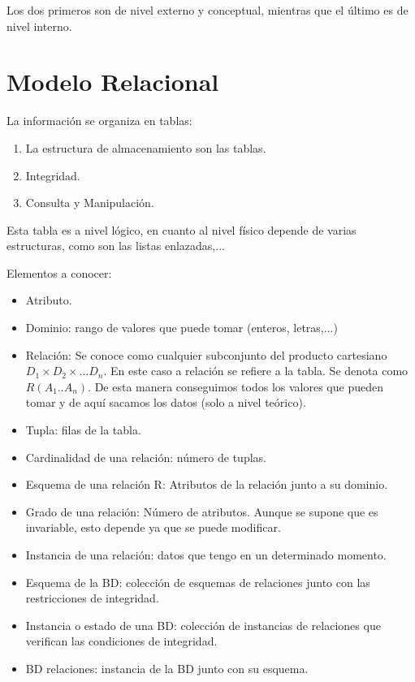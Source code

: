 Los dos primeros son de nivel externo y conceptual, mientras que el último es de nivel interno.

\section{Modelo Relacional}

La información se organiza en tablas: 

\begin{enumerate}
    \item La estructura de almacenamiento son las tablas.
    \item Integridad.
    \item Consulta y Manipulación.
\end{enumerate}

Esta tabla es a nivel lógico, en cuanto al nivel físico depende de varias estructuras, como son las listas enlazadas,...

Elementos a conocer:
\begin{itemize}
    \item Atributo.
    \item Dominio: rango de valores que puede tomar (enteros, letras,...)
    \item Relación: Se conoce como cualquier subconjunto del producto cartesiano $D_1 \times D_2 \times ... D_n$. En este caso a relación se refiere a la tabla. Se denota como $R(A_1..A_n)$. De esta manera conseguimos todos los valores que pueden tomar y de aquí sacamos los datos (solo a nivel teórico).
    \item Tupla: filas de la tabla.
    \item Cardinalidad de una relación: número de tuplas.
    \item Esquema de una relación R: Atributos de la relación junto a su dominio.
    \item Grado de una relación: Número de atributos. Aunque se supone que es invariable, esto depende ya que se puede modificar.
    \item Instancia de una relación: datos que tengo en un determinado momento.
    \item Esquema de la BD: colección de esquemas de relaciones junto con las restricciones de integridad.
    \item Instancia o estado de una BD: colección de instancias de relaciones que verifican las condiciones de integridad.
    \item BD relaciones: instancia de la BD junto con su esquema.
\end{itemize}

